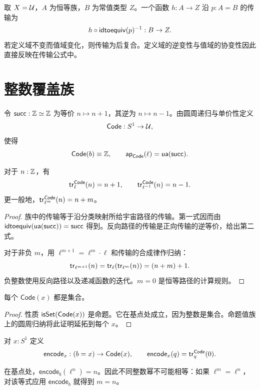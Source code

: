 \begin{example}
取 $X=\mathcal U$，$A$ 为恒等族，$B$ 为常值类型 $Z$。一个函数 $h:A\to Z$ 沿 $p:A=B$ 的传输为
\[
 h\circ\mathsf{idtoequiv}(p)^{-1}:B\to Z.
\]
若定义域不变而值域变化，则传输为后复合。定义域的逆变性与值域的协变性因此直接反映在传输公式中。
\end{example}

\section{整数覆盖族}

\begin{definition}[编码族]
令 $\mathsf{succ}:\mathbb Z\simeq\mathbb Z$ 为等价 $n\mapsto n+1$，其逆为 $n\mapsto n-1$。由圆周递归与单价性定义
\[
 \mathsf{Code}:S^1\to\mathcal U,
\]
使得
\[
 \mathsf{Code}(b)\equiv\mathbb Z,\qquad
 \mathsf{ap}_{\mathsf{Code}}(\ell)=\mathsf{ua}(\mathsf{succ}).
\]
\end{definition}

\begin{proposition}[沿生成环路的传输]
对于 $n:\mathbb Z$，有
\[
 \mathsf{tr}^{\mathsf{Code}}_\ell(n)=n+1,
 \qquad
 \mathsf{tr}^{\mathsf{Code}}_{\ell^{-1}}(n)=n-1.
\]
更一般地，$\mathsf{tr}^{\mathsf{Code}}_{\ell^m}(n)=n+m$。
\end{proposition}
\begin{proof}
族中的传输等于沿分类映射所给宇宙路径的传输。第一式因而由 $\mathsf{idtoequiv}(\mathsf{ua}(\mathsf{succ}))=\mathsf{succ}$ 得到。反向路径的传输是正向传输的逆等价，给出第二式。

对于非负 $m$，用 $\ell^{m+1}=\ell^m\cdot\ell$ 和传输的合成律作归纳：
\[
 \mathsf{tr}_{\ell^{m+1}}(n)
 =\mathsf{tr}_\ell(\mathsf{tr}_{\ell^m}(n))
 =(n+m)+1.
\]
负整数使用反向路径以及递减函数的迭代。$m=0$ 是恒等路径的计算规则。
\end{proof}

\begin{lemma}
每个 $\mathsf{Code}(x)$ 都是集合。
\end{lemma}
\begin{proof}
性质 $\mathsf{isSet}(\mathsf{Code}(x))$ 是命题。它在基点处成立，因为整数是集合。命题值族上的圆周归纳将此证明延拓到每个 $x$。
\end{proof}

\begin{definition}[编码]
对 $x:S^1$ 定义
\[
 \mathsf{encode}_x:(b=x)\to\mathsf{Code}(x),
 \qquad
 \mathsf{encode}_x(q)=\mathsf{tr}^{\mathsf{Code}}_q(0).
\]
\end{definition}

\begin{example}
在基点处，$\mathsf{encode}_b(\ell^n)=n$。因此不同整数幂不可能相等：如果 $\ell^m=\ell^n$，对该等式应用 $\mathsf{encode}_b$ 就得到 $m=n$。
\end{example}

